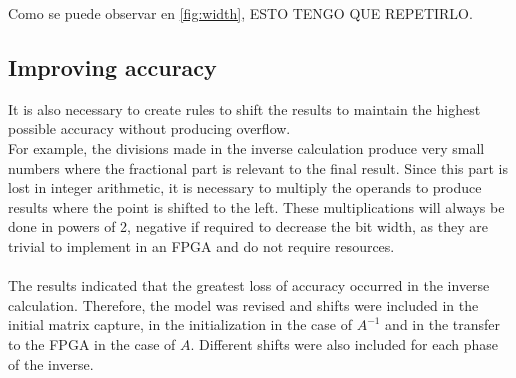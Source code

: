 Como se puede observar en \autoref{fig:width}, ESTO TENGO QUE REPETIRLO.
\\

\subsection{Improving accuracy}
It is also necessary to create rules to shift the results to maintain the highest possible accuracy without producing overflow.
\\
For example, the divisions made in the inverse calculation produce very small numbers where the fractional part is relevant to the final result. Since this part is lost in integer arithmetic, it is necessary to multiply the operands to produce results where the point is shifted to the left. These multiplications will always be done in powers of 2, negative if required to decrease the bit width, as they are trivial to implement in an FPGA and do not require resources.
\\
\\
The results indicated that the greatest loss of accuracy occurred in the inverse calculation. Therefore, the model was revised and shifts were included in the initial matrix capture, in the initialization in the case of $A^{-1}$ and in the transfer to the FPGA in the case of $A$. Different shifts were also included for each phase of the inverse.


